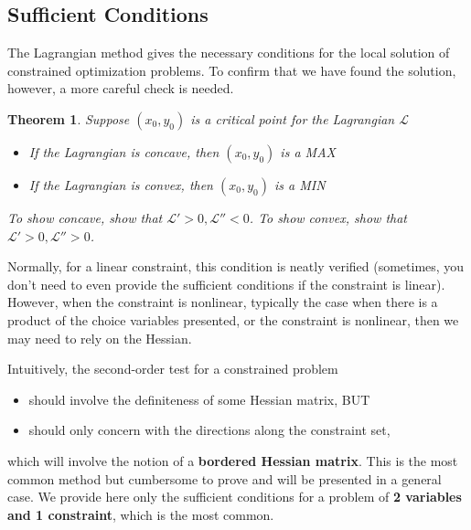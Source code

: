 \documentclass[10pt,a4paper]{book}
\newtheorem{theorem}{Theorem}[section]
\theoremstyle{definition}\newtheorem{definition}{Definition}
\theoremstyle{definition}\newtheorem{fact}{Fact}
\theoremstyle{definition}\newtheorem{ex}{Ex.}
\theoremstyle{definition}\newtheorem{project}{Project}
\theoremstyle{definition}\newtheorem{problem}{Problem}
\theoremstyle{definition}\newtheorem{example}{Example}
\numberwithin{theorem}{chapter}
\numberwithin{corollary}{chapter}
\numberwithin{assumption}{chapter}
\numberwithin{definition}{chapter}
\numberwithin{prop}{chapter}
\numberwithin{notation}{chapter}
\numberwithin{problem}{chapter}
\numberwithin{example}{chapter}
\numberwithin{fact}{chapter}
\numberwithin{ex}{chapter}
\newenvironment{ftheorem}
{\begin{mdframed}\begin{theorem}}
		{\end{theorem}\end{mdframed}}
\begin{document}
	\subsection{Sufficient Conditions}
	The Lagrangian method gives the necessary conditions for the local solution of constrained optimization problems. To confirm that we have found the solution, however, a more careful check is needed. 
	
	\begin{ftheorem}
		Suppose $(x_0,y_0)$ is a critical point for the Lagrangian $\mathcal{L}$
		\begin{itemize}
			\item If the Lagrangian is concave, then $(x_0,y_0)$ is a MAX
			\item If the Lagrangian is convex, then $(x_0,y_0)$ is a MIN
		\end{itemize}
		
		To show concave, show that $\mathcal{L}' > 0, \mathcal{L}'' <0$. To show convex, show that $\mathcal{L}' > 0, \mathcal{L}'' > 0$.
	\end{ftheorem}
	Normally, for a linear constraint, this condition is neatly verified (sometimes, you don't need to even provide the sufficient conditions if the constraint is linear). However, when the constraint is nonlinear, typically the case when there is a product of the choice variables presented, or the constraint is nonlinear, then we may need to rely on the Hessian.
	
	Intuitively, the second-order test for a constrained problem
	\begin{itemize}
		\item should involve the definiteness of some Hessian matrix, BUT
		\item should only concern with the directions along the constraint set,	
	\end{itemize}
	which will involve the notion of a \textbf{bordered Hessian matrix}. This is the most common method but cumbersome to prove and will be presented in a general case. We provide here only the sufficient conditions for a problem of \textbf{2 variables and 1 constraint}, which is the most common.
	
\end{document}
